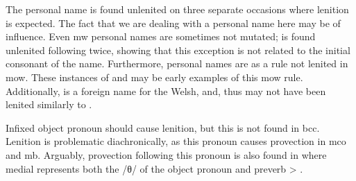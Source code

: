 The personal name  is found unlenited on three separate occasions where lenition is expected.
The fact that we are dealing with a personal name here may be of influence. Even \gls{mw} personal names are sometimes not mutated;  is found unlenited following  twice, showing that this exception is not related to the initial consonant of the name.
Furthermore, personal names are as a rule not lenited in \gls{mow}.
These instances of  and  may be early examples of this \gls{mow} rule.
Additionally,  is a foreign name for the Welsh, and, thus may not have been lenited similarly to .

Infixed object pronoun  should cause lenition, but this is not found in \gls{bcc}.
Lenition is problematic diachronically, as this pronoun causes provection in \gls{mco} and \gls{mb}.
Arguably, provection following this pronoun is also found in  where medial  represents both the /θ/ of the object pronoun and preverb  > .

